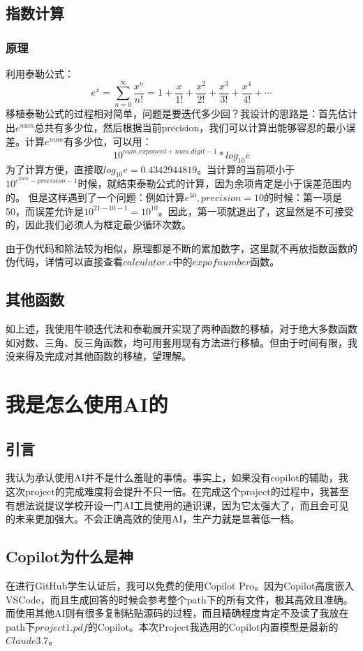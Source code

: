 \documentclass[11pt]{article}
\begin{document}
\subsection{指数计算}
\subsubsection{原理}
利用泰勒公式：
\[
e^x = \sum_{n=0}^{\infty} \frac{x^n}{n!} = 1 + \frac{x}{1!} + \frac{x^2}{2!} + \frac{x^3}{3!} + \frac{x^4}{4!} + \cdots
\]
移植泰勒公式的过程相对简单，问题是要迭代多少回？我设计的思路是：首先估计出$e^{num}$总共有多少位，然后根据当前precision，我们可以计算出能够容忍的最小误差。计算$e^{num}$有多少位，可以用：
$$
10^{num.exponent + num.digit - 1} * log_{10}e
$$
为了计算方便，直接取$log_{10}e=0.4342944819$。当计算的当前项小于$10^{e^{num}-precision-1}$时候，就结束泰勒公式的计算，因为余项肯定是小于误差范围内的。
但是这样遇到了一个问题：例如计算$e^{50},precision=10$的时候：第一项是50，而误差允许是$10^{21-10-1}=10^{10}$。因此，第一项就退出了，这显然是不可接受的，因此我们必须人为框定最少循环次数。


由于伪代码和除法较为相似，原理都是不断的累加数字，这里就不再放指数函数的伪代码，详情可以直接查看$calculator.c$中的$expofnumber$函数。
\subsection{其他函数}
如上述，我使用牛顿迭代法和泰勒展开实现了两种函数的移植，对于绝大多数函数如对数、三角、反三角函数，均可用套用现有方法进行移植。但由于时间有限，我没来得及完成对其他函数的移植，望理解。
\section{我是怎么使用AI的}
\subsection{引言}
我认为承认使用AI并不是什么羞耻的事情。事实上，如果没有copilot的辅助，我这次project的完成难度将会提升不只一倍。在完成这个project的过程中，我甚至有想法说提议学校开设一门AI工具使用的通识课，因为它太强大了，而且会可见的未来更加强大。不会正确高效的使用AI，生产力就是显著低一档。
\subsection{Copilot为什么是神}
在进行GitHub学生认证后，我可以免费的使用Copilot Pro。因为Copilot高度嵌入VSCode，而且生成回答的时候会参考整个path下的所有文件，极其高效且准确。而使用其他AI则有很多复制粘贴源码的过程，而且精确程度肯定不及读了我放在path下$project1.pdf$的Copilot。本次Project我选用的Copilot内置模型是最新的$Claude 3.7$。
\end{document}
